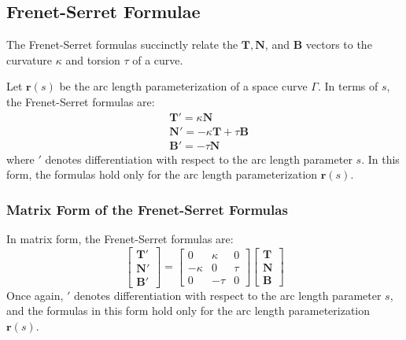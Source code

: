 \documentclass[11pt, a4paper]{article}
\begin{document}
\subsection{Frenet-Serret Formulae}
The Frenet-Serret formulas succinctly relate the $ \mathbf{T}, \mathbf{N} $, and $ \mathbf{B} $ vectors to the curvature $ \kappa $ and torsion $ \tau $ of a curve. 

Let $ \bm{r}(s) $ be the arc length parameterization of a space curve $ \Gamma $. In terms of $ s $, the Frenet-Serret formulas are:
\begin{align*}
	& \mathbf{T}' = \kappa \mathbf{N}\\
	& \mathbf{N}' = -\kappa \mathbf{T} + \tau \mathbf{B}\\
	& \mathbf{B}' = - \tau \mathbf{N}
\end{align*}
where $ ' $ denotes differentiation with respect to the arc length parameter $ s $. In this form, the formulas hold only for the arc length parameterization $ \bm{r}(s) $.

\subsubsection{Matrix Form of the Frenet-Serret Formulas}
In matrix form, the Frenet-Serret formulas are:
\[
\begin{bmatrix} 
	\mathbf{T'} \\ 
	\mathbf{N'} \\ 
	\mathbf{B'} 
\end{bmatrix}
= 
\begin{bmatrix}
0 & \kappa & 0 \\
-\kappa & 0 & \tau \\
 0 & -\tau & 0 
\end{bmatrix} 
\begin{bmatrix} 
	\mathbf{T} \\ 
	\mathbf{N} \\ 
	\mathbf{B}
\end{bmatrix}
\]
Once again, $ ' $ denotes differentiation with respect to the arc length parameter $ s $, and the formulas in this form hold only for the arc length parameterization $ \bm{r}(s) $.
\end{document}
